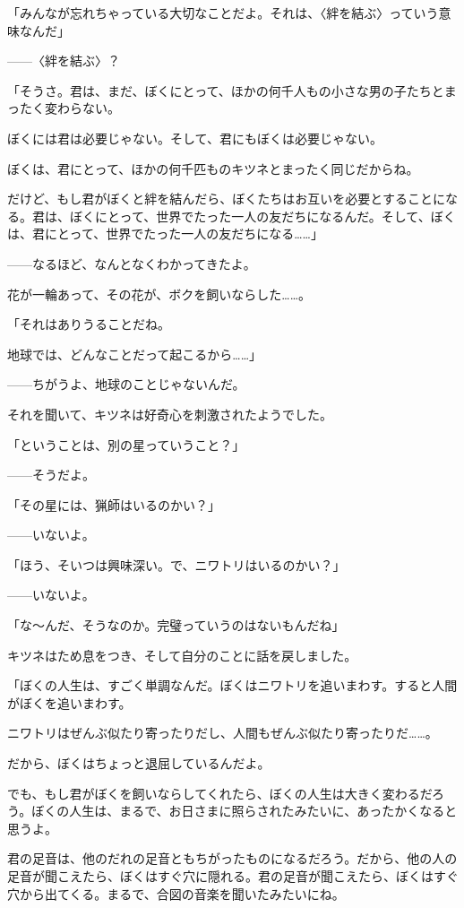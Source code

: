 「みんなが忘れちゃっている大切なことだよ。それは、〈絆を結ぶ〉っていう意味なんだ」

——〈絆を結ぶ〉？

「そうさ。君は、まだ、ぼくにとって、ほかの何千人もの小さな男の子たちとまったく変わらない。

ぼくには君は必要じゃない。そして、君にもぼくは必要じゃない。

ぼくは、君にとって、ほかの何千匹ものキツネとまったく同じだからね。

だけど、もし君がぼくと絆を結んだら、ぼくたちはお互いを必要とすることになる。君は、ぼくにとって、世界でたった一人の友だちになるんだ。そして、ぼくは、君にとって、世界でたった一人の友だちになる……」

——なるほど、なんとなくわかってきたよ。

花が一輪あって、その花が、ボクを飼いならした……。

「それはありうることだね。

地球では、どんなことだって起こるから……」

——ちがうよ、地球のことじゃないんだ。

それを聞いて、キツネは好奇心を刺激されたようでした。

「ということは、別の星っていうこと？」


——そうだよ。

「その星には、猟師はいるのかい？」

——いないよ。

「ほう、そいつは興味深い。で、ニワトリはいるのかい？」

——いないよ。

「な～んだ、そうなのか。完璧っていうのはないもんだね」

キツネはため息をつき、そして自分のことに話を戻しました。

「ぼくの人生は、すごく単調なんだ。ぼくはニワトリを追いまわす。すると人間がぼくを追いまわす。

ニワトリはぜんぶ似たり寄ったりだし、人間もぜんぶ似たり寄ったりだ……。

だから、ぼくはちょっと退屈しているんだよ。

でも、もし君がぼくを飼いならしてくれたら、ぼくの人生は大きく変わるだろう。ぼくの人生は、まるで、お日さまに照らされたみたいに、あったかくなると思うよ。

君の足音は、他のだれの足音ともちがったものになるだろう。だから、他の人の足音が聞こえたら、ぼくはすぐ穴に隠れる。君の足音が聞こえたら、ぼくはすぐ穴から出てくる。まるで、合図の音楽を聞いたみたいにね。

